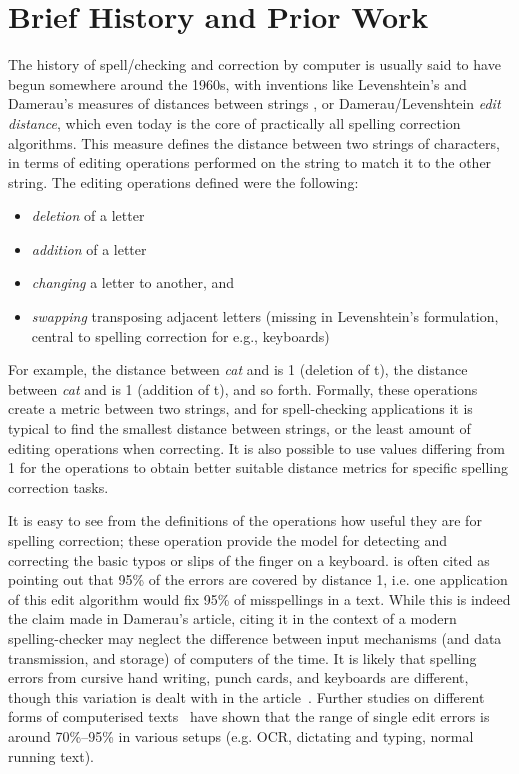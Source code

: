 \documentclass[officiallayout,final]{unihelcompling}
\newcommand\misspelt{\bgroup\markoverwith
{\textcolor{red}{\lower3.5pt\hbox{\sixly \char58}}}\ULon}
\begin{document}
\section{Brief History and Prior Work}
\label{sec:history}

The history of spell\-/checking and correction by computer is usually said
to have begun somewhere around the 1960s, with inventions like Levenshtein's and
Damerau's measures of distances between strings
\citep{levenshtein1966binary,damerau1964technique}, or Damerau\-/Levenshtein
\emph{edit distance}, which even today is the core of practically all spelling
correction algorithms. This measure defines the distance between two strings of
characters, in terms of editing operations performed on the string to match it
to the other string. The editing operations defined were the following:

\begin{itemize}
    \item \emph{deletion} of a letter
    \item \emph{addition} of a letter
    \item \emph{changing} a letter to another, and
    \item \emph{swapping} transposing adjacent letters (missing in
        Levenshtein's formulation, central to spelling correction for
        e.g., keyboards)
\end{itemize}

For example, the distance between \emph{cat} and \misspelt{ca} is 1 (deletion
of t), the distance between \emph{cat} and \misspelt{catt} is 1 (addition of
t), and so forth. Formally, these operations create a metric between two
strings, and for spell-checking applications it is typical to find the smallest
distance between strings, or the least amount of editing operations when
correcting. It is also possible to use values differing from 1 for the
operations to obtain better suitable distance metrics for specific spelling
correction tasks.

It is easy to see from the definitions of the operations how useful they are
for spelling correction; these operation provide the model for detecting and
correcting the basic typos or slips of the finger on a keyboard.
\citet{damerau1964technique} is often cited as pointing out that 95\% of the
errors are covered by distance 1, i.e. one application of this edit algorithm
would fix 95\% of misspellings in a text.  While this is indeed the claim made
in Damerau's article, citing it in the context of a modern spelling-checker may
neglect the difference between input mechanisms (and data transmission, and
storage) of computers of the time. It is likely that spelling errors from
cursive hand writing, punch cards, and keyboards are different, though this
variation is dealt with in the article~\citep{damerau1964technique}. Further
studies on different forms of computerised texts~\citep{kukich1992techniques}
have shown that the range of single edit errors is around 70\%--95\% in various
setups (e.g. OCR, dictating and typing, normal running text).
\end{document}
